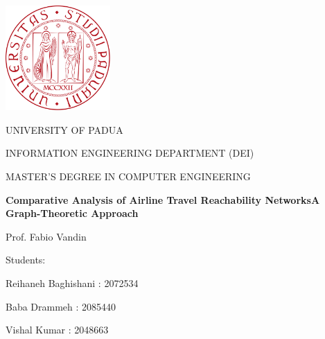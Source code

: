 \begin{titlepage}
    \begin{center}
        \includegraphics[width=4cm]{images/logo.png}
        
        \vspace*{1cm}
        \Large
        \textmd{UNIVERSITY OF PADUA}
        
        \vspace*{1cm}
        \large
        \textmd{INFORMATION ENGINEERING DEPARTMENT (DEI)}
                
        \vspace*{0.5cm}
        \large
        \textmd{MASTER'S DEGREE IN COMPUTER ENGINEERING} 
                
        \vspace*{1cm}
        \Huge
        \textbf{Comparative Analysis of Airline Travel Reachability Networks\newline A Graph-Theoretic Approach}
        
        
        \vspace*{1cm}
        \large
        \textmd{Prof. Fabio Vandin}

        \vspace*{0.5cm}
        \large
        \textmd{Students:}
                
        \textmd{Reihaneh Baghishani : 2072534}       
        
        \textmd{Baba Drammeh : 2085440}        
        
        \textmd{Vishal Kumar : 2048663}
        
    \end{center}
\end{titlepage}